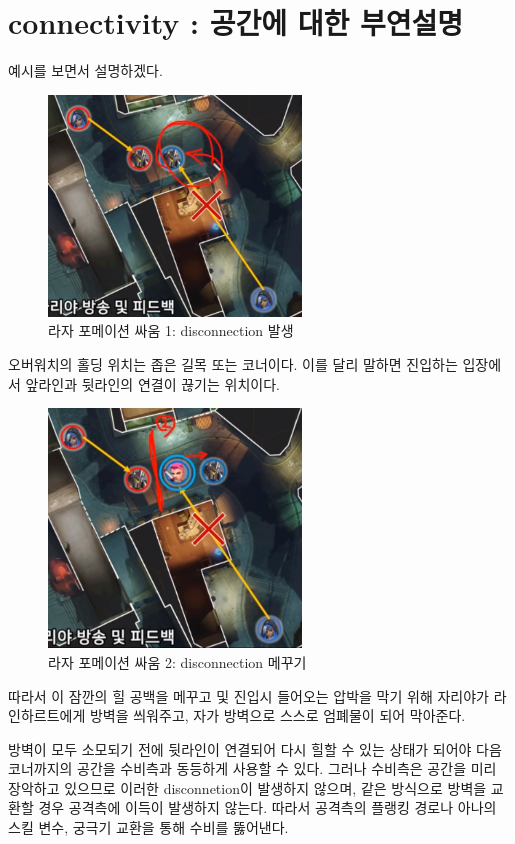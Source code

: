 \section{connectivity : 공간에 대한 부연설명}
예시를 보면서 설명하겠다.\cite{rz_form}
\begin{figure}[H]
    \centering
    \includegraphics[width=0.6\textwidth]{figures/rz_form/disconneted.png}
    \caption{라자 포메이션 싸움 1: disconnection 발생}
    \label{fig:RZ_1}
\end{figure}
오버워치의 홀딩 위치는 좁은 길목 또는 코너이다. 이를 달리 말하면 진입하는 입장에서 앞라인과 뒷라인의 연결이 끊기는 위치이다.
\begin{figure}[H]
    \centering
    \includegraphics[width=0.6\textwidth]{figures/rz_form/bubble.png}
    \caption{라자 포메이션 싸움 2: disconnection 메꾸기}
    \label{fig:RZ_2}
\end{figure}
따라서 이 잠깐의 힐 공백을 메꾸고 및 진입시 들어오는 압박을 막기 위해 자리야가 라인하르트에게 방벽을 씌워주고, 자가 방벽으로 스스로 엄폐물이 되어 막아준다.

방벽이 모두 소모되기 전에 뒷라인이 연결되어 다시 힐할 수 있는 상태가 되어야 다음 코너까지의 공간을 수비측과 동등하게 사용할 수 있다.
그러나 수비측은 공간을 미리 장악하고 있으므로 이러한 disconnetion이 발생하지 않으며, 같은 방식으로 방벽을 교환할 경우 공격측에 이득이 발생하지 않는다.
따라서 공격측의 플랭킹 경로나 아나의 스킬 변수, 궁극기 교환을 통해 수비를 뚫어낸다.

